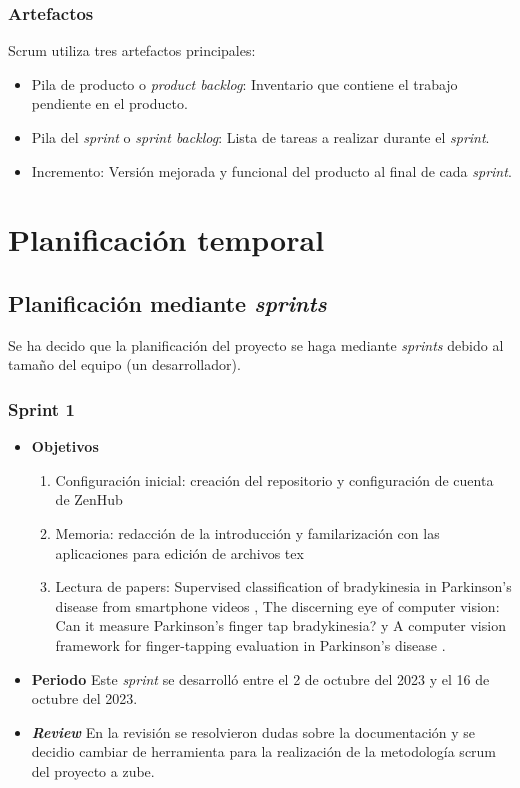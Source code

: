 \subsubsection{Artefactos}
Scrum utiliza tres artefactos principales:
\begin{itemize}
\item Pila de producto o \textsl{product backlog}: Inventario que contiene el trabajo pendiente en el producto.
\item Pila del \textsl{sprint} o \textsl{sprint backlog}: Lista de tareas a realizar durante el \textsl{sprint}.
\item Incremento: Versión mejorada y funcional del producto al final de cada \textsl{sprint}.
\end{itemize}




 
\section{Planificación temporal}
\subsection{Planificación mediante \textsl{sprints}}
Se ha decido que la planificación del proyecto se haga mediante \textsl{sprints} debido al tamaño del equipo (un desarrollador).


\subsubsection{Sprint 1}
\begin{itemize}
\item \textbf{Objetivos}
\begin{enumerate}
\item Configuración inicial: creación del repositorio y configuración de cuenta de ZenHub
\item Memoria: redacción de la introducción y familarización con las aplicaciones para edición de archivos tex
\item Lectura de papers:  Supervised classification of bradykinesia in Parkinson’s disease from smartphone videos  \cite{williams2020discerning}, The discerning eye of computer vision: Can it measure Parkinson's finger tap bradykinesia? \cite{williams2020supervised}  y A computer vision framework for finger-tapping evaluation in Parkinson's disease \cite{khan2014computer}.
\end{enumerate}
\item \textbf{Periodo}
Este \textsl{sprint} se desarrolló entre el 2 de octubre del 2023 y el 16 de octubre del 2023.
\item \textbf{\textsl{Review}}
En la revisión se resolvieron dudas sobre la documentación y se decidio cambiar de herramienta para la realización de la metodología scrum del proyecto a zube. 


\end{itemize}

